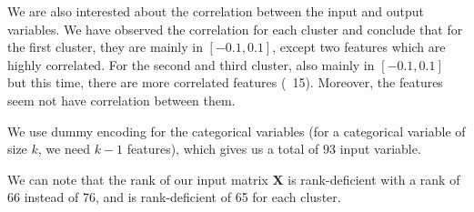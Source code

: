 \documentclass{article} %
\begin{document}
We are also interested about the correlation between the input and output variables. We have observed the correlation for each cluster and conclude that for the first cluster, they are mainly in $[-0.1,0.1]$, except two features which are highly correlated. For the second and third cluster, also mainly in $[-0.1,0.1]$ but this time, there are more correlated features (~15). Moreover, the features seem not have correlation between them.

We use dummy encoding for the categorical variables (for a categorical variable of size $k$, we need $k-1$ features), which gives us a total of $93$ input variable.

We can note that the rank of our input matrix $\mathbf{X}$ is rank-deficient with a rank of 66 instead of 76, and is rank-deficient of 65 for each cluster.
\end{document}
